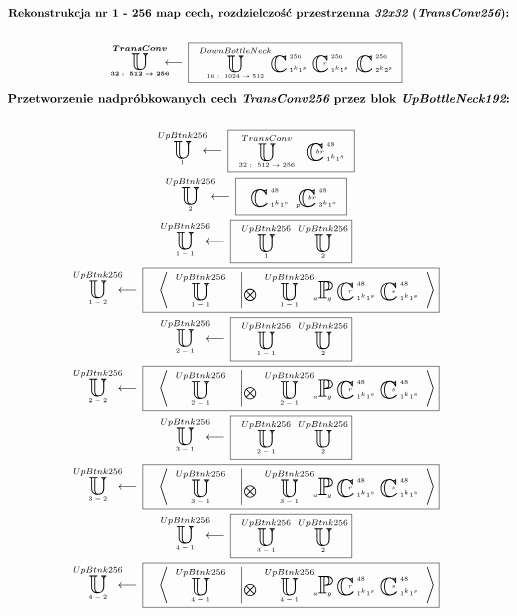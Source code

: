 \begin{equation*}
\begin{gathered}
\textbf{Rekonstrukcja nr 1 - 256 map cech, rozdzielczość przestrzenna $\textit{32x32}$ ($\textit{TransConv256}$):}
\\~\\
\xunitdef{\boldsymbol{TransConv}}{\boldsymbol{32:\ 512\rightarrow256}}{\quad
\xunit{DownBottleNeck}{16:\ 1024\rightarrow512}{}
\xconv{\ 1^k1^s}{\ 256}{}{}{}
\xconv{\ 1^k1^s}{\ 256}{}{}{r}
\xconv{\ 2^k2^s}{\ 256}{t}{}{}}
\end{gathered}
\end{equation*}
\begin{equation*}
\begin{gathered}
\textbf{Przetworzenie nadpróbkowanych cech $\textit{TransConv256}$ przez blok $\textit{UpBottleNeck192}$:}
\\~\\
\xunitdef{UpBtnk256}{1}{\quad
\xunit{TransConv}{32:\ 512\rightarrow256}{} \quad
\xconv{\ 1^k1^s}{\ 48}{}{}{br}}
\\
\xunitdef{UpBtnk256}{2}{\quad
\xconv{\ 1^k1^s}{\ 48}{}{}{}
\xconv{\ 3^k1^s}{\ 48}{p}{}{br}}
\\
\xunitdef{UpBtnk256}{1-1}{\quad
\xunit{UpBtnk256}{1}{} \quad
\xunit{UpBtnk256}{2}{}}
\\
\xunitdef{UpBtnk256}{1-2}{\quad
\xaggreg{\quad
\xunit{UpBtnk256}{1-1}{}
\quad \left|_{\bigotimes} \quad
\xunit{UpBtnk256}{1-1}{}
\xpool{g}{}{a}{}{}
\xconv{\ 1^k1^s}{\ 48}{}{}{r}
\xconv{\ 1^k1^s}{\ 48}{}{}{s}
\right.}}
\\
\xunitdef{UpBtnk256}{2-1}{\quad
\xunit{UpBtnk256}{1-1}{} \quad
\xunit{UpBtnk256}{2}{}}
\\
\xunitdef{UpBtnk256}{2-2}{\quad
\xaggreg{\quad
\xunit{UpBtnk256}{2-1}{}
\quad \left|_{\bigotimes} \quad
\xunit{UpBtnk256}{2-1}{}
\xpool{g}{}{a}{}{}
\xconv{\ 1^k1^s}{\ 48}{}{}{r}
\xconv{\ 1^k1^s}{\ 48}{}{}{s}
\right.}}
\\
\xunitdef{UpBtnk256}{3-1}{\quad
\xunit{UpBtnk256}{2-1}{} \quad
\xunit{UpBtnk256}{2}{}}
\\
\xunitdef{UpBtnk256}{3-2}{\quad
\xaggreg{\quad
\xunit{UpBtnk256}{3-1}{}
\quad \left|_{\bigotimes} \quad
\xunit{UpBtnk256}{3-1}{}
\xpool{g}{}{a}{}{}
\xconv{\ 1^k1^s}{\ 48}{}{}{r}
\xconv{\ 1^k1^s}{\ 48}{}{}{s}
\right.}}
\\
\xunitdef{UpBtnk256}{4-1}{\quad
\xunit{UpBtnk256}{3-1}{} \quad
\xunit{UpBtnk256}{2}{}}
\\
\xunitdef{UpBtnk256}{4-2}{\quad
\xaggreg{\quad
\xunit{UpBtnk256}{4-1}{}
\quad \left|_{\bigotimes} \quad
\xunit{UpBtnk256}{4-1}{}
\xpool{g}{}{a}{}{}
\xconv{\ 1^k1^s}{\ 48}{}{}{r}
\xconv{\ 1^k1^s}{\ 48}{}{}{s}
\right.}}
\end{gathered}
\end{equation*}
